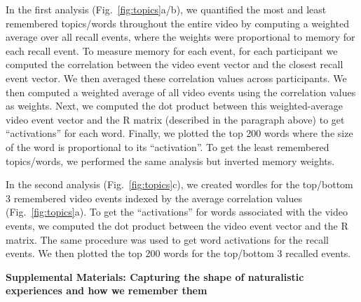 \documentclass{article}
\begin{document}
{In the first analysis (Fig.~\ref{fig:topics}a/b), we quantified the most and least remembered topics/words throughout the entire video by computing a weighted average over all recall events, where the weights were proportional to memory for each recall event. To measure memory for each event, for each participant we computed the correlation between the video event vector and the closest recall event vector. We then averaged these correlation values across participants. We then computed a weighted average of all video events using the correlation values as weights. Next, we computed the dot product between this weighted-average video event vector and the R matrix (described in the paragraph above) to get ``activations'' for each word. Finally, we plotted the top 200 words where the size of the word is proportional to its ``activation''. To get the least remembered topics/words, we performed the same analysis but inverted memory weights.

In the second analysis (Fig.~\ref{fig:topics}c), we created wordles for the top/bottom 3 remembered video events indexed by the average correlation values (Fig.~\ref{fig:topics}a).  To get the ``activations'' for words associated with the video events, we computed the dot product between the video event vector and the R matrix. The same procedure was used to get word activations for the recall events. We then plotted the top 200 words for the top/bottom 3 recalled events.




\pagebreak
\begin{center}
\textbf{\large Supplemental Materials: Capturing the shape of naturalistic experiences and how we remember them}
\end{center}
\setcounter{equation}{0}
\setcounter{figure}{0}
\setcounter{table}{0}
\setcounter{page}{1}
\setcounter{section}{0}
\makeatletter
\renewcommand{\theequation}{S\arabic{equation}}
\renewcommand{\thefigure}{S\arabic{figure}}
\renewcommand{\bibnumfmt}[1]{[S#1]}
\renewcommand{\citenumfont}[1]{S#1}

}
\end{document}
